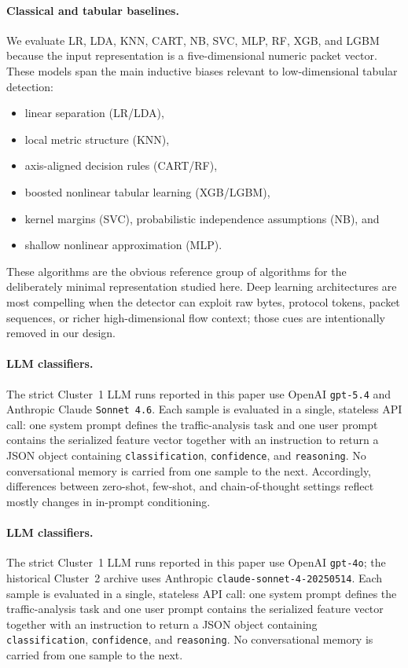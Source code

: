 \documentclass[conference]{IEEEtran}
\begin{document}
\paragraph{Classical and tabular baselines.}
We evaluate LR, LDA, KNN, CART, NB, SVC, MLP, RF, XGB, and LGBM because the input representation is a five-dimensional numeric packet vector. These models span the main inductive biases relevant to low-dimensional tabular detection: 
\begin{itemize}
    \item linear separation (LR/LDA), 
    \item local metric structure (KNN), 
    \item axis-aligned decision rules (CART/RF), 
    \item boosted nonlinear tabular learning (XGB/LGBM), 
    \item kernel margins (SVC), probabilistic independence assumptions (NB), and 
    \item shallow nonlinear approximation (MLP). 
\end{itemize}

These algorithms are the obvious reference group of algorithms for the deliberately minimal representation studied here. Deep learning architectures are most compelling when the detector can exploit raw bytes, protocol tokens, packet sequences, or richer high-dimensional flow context; those cues are intentionally removed in our design.

\paragraph{LLM classifiers.}
The strict Cluster~1 LLM runs reported in this paper use OpenAI \texttt{gpt-5.4} and Anthropic Claude \texttt{Sonnet~4.6}. Each sample is evaluated in a single, stateless API call: one system prompt defines the traffic-analysis task and one user prompt contains the serialized feature vector together with an instruction to return a JSON object containing \texttt{classification}, \texttt{confidence}, and \texttt{reasoning}. No conversational memory is carried from one sample to the next. Accordingly, differences between zero-shot, few-shot, and chain-of-thought settings reflect mostly changes in in-prompt conditioning.

\paragraph{LLM classifiers.}
The strict Cluster~1 LLM runs reported in this paper use OpenAI \texttt{gpt-4o}; the historical Cluster~2 archive uses Anthropic \texttt{claude-sonnet-4-20250514}. Each sample is evaluated in a single, stateless API call: one system prompt defines the traffic-analysis task and one user prompt contains the serialized feature vector together with an instruction to return a JSON object containing \texttt{classification}, \texttt{confidence}, and \texttt{reasoning}. No conversational memory is carried from one sample to the next. 
\end{document}
